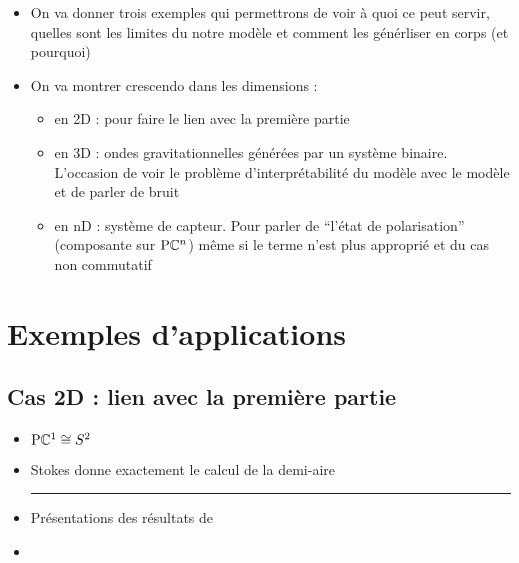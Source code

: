 
\begin{itemize}
	\item On va donner trois exemples qui permettrons de voir à quoi ce peut servir, quelles sont les limites du notre modèle et comment les générliser en corps (et pourquoi)
	
	\item On va montrer crescendo dans les dimensions :\begin{itemize}
		
		\item en 2D  : pour faire le lien avec la première partie
		
		\item en 3D : ondes gravitationnelles générées par un système binaire. L'occasion de voir le problème d'interprétabilité du modèle avec le modèle et de parler de bruit
		
		\item en nD : système de capteur. Pour parler de ``l'état de polarisation'' (composante sur $\text{\normalfont P}\mathbb{C}^{n}$) même si le terme n'est plus approprié et du cas non commutatif
	\end{itemize}
\end{itemize}

\section{\todo Exemples d'applications} \label{sec:exemples_appli}

\subsection{\todo Cas 2D : lien avec la première partie} \label{subsec:ex-2D}

\begin{itemize}
	
	\item $\text{\normalfont P}\mathbb{C}^{1} \cong S^2$
	
	\item Stokes donne exactement le calcul de la demi-aire \\
	
	\hrule
	
	\item Présentations des résultats de \cite{le_bihan_modephysiques_2023}
	
	\item {}
	
\end{itemize}



